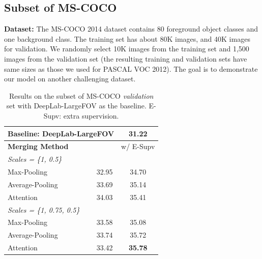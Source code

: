 
\subsection{Subset of MS-COCO}
\textbf{Dataset:} The MS-COCO 2014 dataset \cite{lin2014microsoft} contains 80 foreground object classes and one background class. The training set has about 80K images, and 40K images for validation. We randomly select 10K images from the training set and 1,500 images from the validation set (the resulting training and validation sets have same sizes as those we used for PASCAL VOC 2012). The goal is to demonstrate our model on another challenging dataset.

\begin{table}
  \centering
  \addtolength{\tabcolsep}{2.5pt}
    \begin{tabular}{l c c}
      \toprule[0.2 em]
      \multicolumn{2}{l}{Baseline: DeepLab-LargeFOV} & 31.22 \\
      \toprule[0.2 em]
      {\bf Merging Method} & & w/ E-Supv \\
      \midrule \midrule
      {\it Scales = \{1, 0.5\}} & & \\
      Max-Pooling & 32.95 & 34.70 \\
      Average-Pooling & 33.69 & 35.14 \\
      Attention & 34.03 & 35.41 \\
      \midrule
      {\it Scales = \{1, 0.75, 0.5\}} & & \\
      Max-Pooling & 33.58 & 35.08 \\
      Average-Pooling & 33.74 & 35.72 \\
      Attention & 33.42 & {\bf 35.78} \\
      \bottomrule[0.1 em]
    \end{tabular}
    \vspace{1pt}
    \caption{Results on the subset of MS-COCO {\it validation} set with DeepLab-LargeFOV as the baseline. E-Supv: extra supervision.}
    \label{tab:deeplab_coco}
\end{table}

